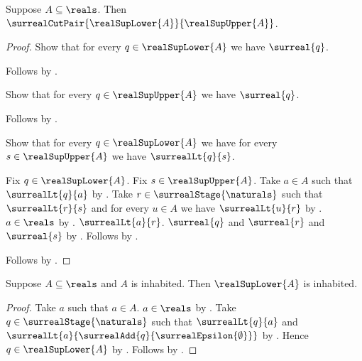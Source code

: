 \begin{proposition}\label{surreal_real_sup_cut_pair}
    Suppose $A\subseteq\reals$.
    Then $\surrealCutPair{\realSupLower{A}}{\realSupUpper{A}}$.
\end{proposition}
\begin{proof}
    Show that for every $q\in\realSupLower{A}$ we have $\surreal{q}$.
    \begin{subproof}
        Follows by
            .
    \end{subproof}
    Show that for every $q\in\realSupUpper{A}$ we have $\surreal{q}$.
    \begin{subproof}
        Follows by
            .
    \end{subproof}
    Show that for every $q\in\realSupLower{A}$ we have
        for every $s\in\realSupUpper{A}$ we have $\surrealLt{q}{s}$.
    \begin{subproof}
        Fix $q\in\realSupLower{A}$.
        Fix $s\in\realSupUpper{A}$.
        Take $a\in A$ such that $\surrealLt{q}{a}$
            by .
        Take $r\in\surrealStage{\naturals}$ such that
            $\surrealLt{r}{s}$ and
            for every $u\in A$ we have $\surrealLt{u}{r}$
            by .
        $a\in\reals$ by .
        $\surrealLt{a}{r}$.
        $\surreal{q}$ and $\surreal{r}$ and $\surreal{s}$
            by
            .
        Follows by
            .
    \end{subproof}
    Follows by .
\end{proof}

\begin{proposition}\label{surreal_real_sup_lower_inhabited}
    Suppose $A\subseteq\reals$ and $A$ is inhabited.
    Then $\realSupLower{A}$ is inhabited.
\end{proposition}
\begin{proof}
    Take $a$ such that $a\in A$.
    $a\in\reals$ by .
    Take $q\in\surrealStage{\naturals}$ such that
        $\surrealLt{q}{a}$ and
        $\surrealLt{a}{
            \surrealAdd{q}{\surrealEpsilon{\emptyset}}}$
        by
        .
    Hence $q\in\realSupLower{A}$
        by .
    Follows by \auto.
\end{proof}

